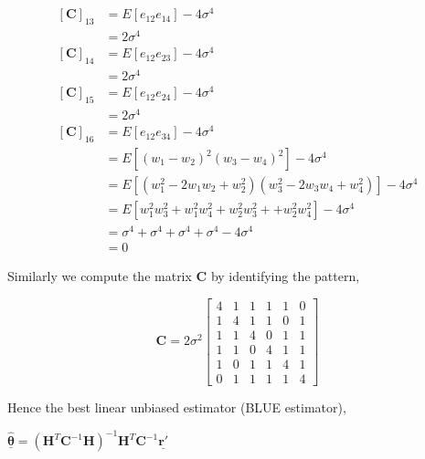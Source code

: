 \documentclass[a4 paper]{article}
\begin{document}
\begin{align*}
\\ [\mathbf{C}]_{13} &= E[e_{12}e_{14}] -4\sigma^{4}
\\ &= 2\sigma^{4}
\\ [\mathbf{C}]_{14} &= E[e_{12}e_{23}] -4\sigma^{4}
\\ &= 2\sigma^{4}
\\ [\mathbf{C}]_{15} &= E[e_{12}e_{24}] -4\sigma^{4}
\\ &= 2\sigma^{4}
\\ [\mathbf{C}]_{16} &= E[e_{12}e_{34}] -4\sigma^{4}
\\ &= E[(w_{1}-w_{2})^{2}(w_{3}-w_{4})^{2}] -4\sigma^{4}
\\ &= E[(w_{1}^{2}-2w_{1}w_{2}+w_{2}^{2})(w_{3}^{2}-2w_{3}w_{4}+w_{4}^{2})] -4\sigma^{4}
\\ &= E[w_{1}^{2}w_{3}^{2}+w_{1}^{2}w_{4}^{2}+w_{2}^{2}w_{3}^{2}++w_{2}^{2}w_{4}^{2}]  -4\sigma^{4}
\\ &= \sigma^{4}+\sigma^{4}+\sigma^{4}+\sigma^{4} -4\sigma^{4}
\\ &= 0
\end{align*}

Similarly we compute the matrix $\mathbf{C}$ by identifying the pattern, 

\[
\mathbf{C} = 
2\sigma^{2}
\begin{bmatrix}
4 & 1 & 1 & 1 & 1 & 0 \\
1 & 4 & 1 & 1 & 0 & 1 \\
1 & 1 & 4 & 0 & 1 & 1 \\
1 & 1 & 0 & 4 & 1 & 1 \\
1 & 0 & 1 & 1 & 4 & 1 \\
0 & 1 & 1 & 1 & 1 & 4
\end{bmatrix}
\]

Hence the best linear unbiased estimator (BLUE estimator),
\\ \centerline{$\hat{\mathbf{\underline{\theta}}} = (\mathbf{H}^{T}\mathbf{C}^{-1}\mathbf{H})^{-1}\mathbf{H}^{T}\mathbf{C}^{-1} \mathbf{\underline{r'}}$}






\newpage
{}
\end{document}
